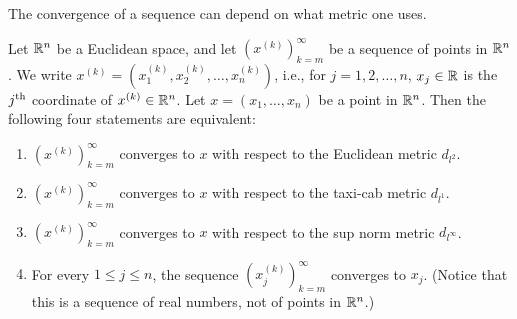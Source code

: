 \begin{note}
  The convergence of a sequence can depend on what metric one uses.
\end{note}

\setcounter{thm}{17}
\begin{prop}\label{ii:1.1.18}
  Let \(\mathbb{R}^n\) be a Euclidean space, and let \((x^{(k)})_{k = m}^\infty\) be a sequence of points in \(\mathbb{R}^n\).
  We write \(x^{(k)} = (x_1^{(k)}, x_2^{(k)}, \dots, x_n^{(k)})\), i.e., for \(j = 1, 2, \dots, n\), \(x_j \in \mathbb{R}\) is the \(j^{\operatorname{th}}\) coordinate of \(x^{(k)} \in \mathbb{R}^n\).
  Let \(x = (x_1, \dots, x_n)\) be a point in \(\mathbb{R}^n\).
  Then the following four statements are equivalent:
  \begin{enumerate}
    \item\label{ii:1.1.18.a} \((x^{(k)})_{k = m}^\infty\) converges to \(x\) with respect to the Euclidean metric \(d_{l^2}\).
    \item\label{ii:1.1.18.b} \((x^{(k)})_{k = m}^\infty\) converges to \(x\) with respect to the taxi-cab metric \(d_{l^1}\).
    \item\label{ii:1.1.18.c} \((x^{(k)})_{k = m}^\infty\) converges to \(x\) with respect to the sup norm metric \(d_{l^\infty}\).
    \item\label{ii:1.1.18.d} For every \(1 \leq j \leq n\), the sequence \((x_j^{(k)})_{k = m}^\infty\) converges to \(x_j\).
    (Notice that this is a sequence of real numbers, not of points in \(\mathbb{R}^n\).)
  \end{enumerate}
\end{prop}

